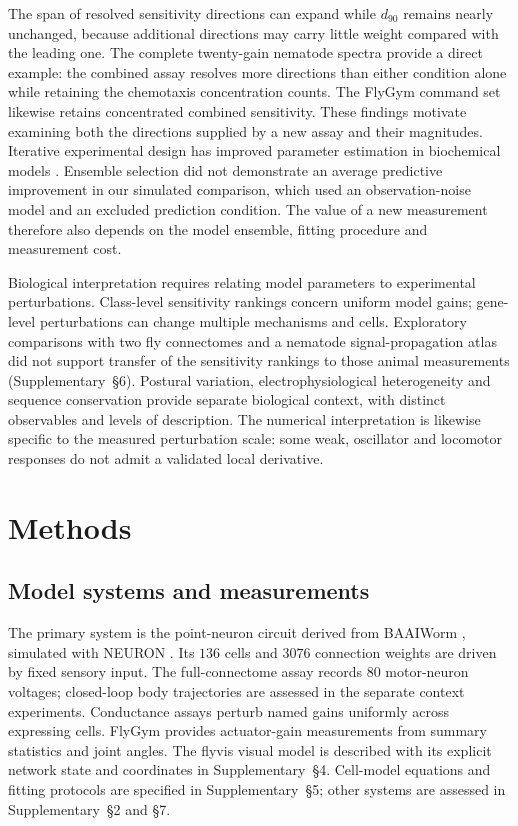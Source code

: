 \documentclass[11pt,letterpaper]{article}
\begin{document}
The span of resolved sensitivity directions can expand while $d_{90}$ remains nearly unchanged, because additional directions may carry little weight compared with the leading one. The complete twenty-gain nematode spectra provide a direct example: the combined assay resolves more directions than either condition alone while retaining the chemotaxis concentration counts. The FlyGym command set likewise retains concentrated combined sensitivity. These findings motivate examining both the directions supplied by a new assay and their magnitudes. Iterative experimental design has improved parameter estimation in biochemical models \citep{sethna2010sloppy,transtrum2012selection,balsacanto2010identification}. Ensemble selection did not demonstrate an average predictive improvement in our simulated comparison, which used an observation-noise model and an excluded prediction condition. The value of a new measurement therefore also depends on the model ensemble, fitting procedure and measurement cost.

Biological interpretation requires relating model parameters to experimental perturbations. Class-level sensitivity rankings concern uniform model gains; gene-level perturbations can change multiple mechanisms and cells. Exploratory comparisons with two fly connectomes and a nematode signal-propagation atlas did not support transfer of the sensitivity rankings to those animal measurements (Supplementary~\S6). Postural variation, electrophysiological heterogeneity and sequence conservation provide separate biological context, with distinct observables and levels of description. The numerical interpretation is likewise specific to the measured perturbation scale: some weak, oscillator and locomotor responses do not admit a validated local derivative.

\section*{Methods}
\subsection*{Model systems and measurements}
The primary system is the point-neuron circuit derived from BAAIWorm \citep{wang2025baaiworm}, simulated with NEURON \citep{hines1997neuron}. Its $136$ cells and $3076$ connection weights are driven by fixed sensory input. The full-connectome assay records $80$ motor-neuron voltages; closed-loop body trajectories are assessed in the separate context experiments. Conductance assays perturb named gains uniformly across expressing cells. FlyGym \citep{wangchen2024neuromechfly} provides actuator-gain measurements from summary statistics and joint angles. The flyvis visual model \citep{lappalainen2024connectome} is described with its explicit network state and coordinates in Supplementary~\S4. Cell-model equations and fitting protocols are specified in Supplementary~\S5; other systems are assessed in Supplementary~\S2 and \S7.
\end{document}
